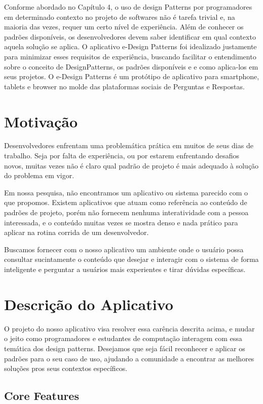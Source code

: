 Conforme abordado no Capítulo 4, o uso de design Patterns por programadores em determinado contexto no projeto de softwares não é tarefa trivial e, na maioria das vezes, requer um certo nível de experiência. Além de conhecer os padrões disponíveis, os desenvolvedores devem saber identificar em qual contexto aquela solução se aplica. O aplicativo e-Design Patterns foi idealizado justamente para minimizar esses requisitos de experiência, buscando facilitar o entendimento sobre o conceito de DesignPatterns, os padrões disponíveis e e como aplica-los em seus projetos. O e-Design Patterns é um protótipo de aplicativo para smartphone, tablets e browser no molde das plataformas sociais de Perguntas e Respostas.

\section{ Motivação}
Desenvolvedores enfrentam uma problemática prática em muitos de seus dias de trabalho. Seja por falta de experiência, ou por estarem enfrentando desafios novos, muitas vezes não é claro qual padrão de projeto é mais adequado à solução do problema em vigor.

Em nossa pesquisa, não encontramos um aplicativo ou sistema parecido com o que propomos. Existem aplicativos que atuam como referência ao conteúdo de padrões de projeto, porém não fornecem nenhuma interatividade com a pessoa interessada, e o conteúdo muitas vezes se mostra denso e nada prático para aplicar na rotina corrida de um desenvolvedor.

Buscamos fornecer com o nosso aplicativo um ambiente onde o usuário possa consultar sucintamente o conteúdo que desejar e interagir com o sistema de forma inteligente e perguntar a usuários mais experientes e tirar dúvidas específicas.

\section{Descrição do Aplicativo}
O projeto do nosso aplicativo visa resolver essa carência descrita acima, e mudar o jeito como programadores e estudantes de computação interagem com essa temática dos design patterns. Desejamos que seja fácil reconhecer e aplicar os padrões para o seu caso de uso, ajudando a comunidade a encontrar as melhores soluções pros seus contextos específicos.

\subsection{Core Features}

